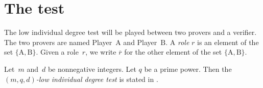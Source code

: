 \section{The test}\label{sec:the-test}

\begin{definition}[Roles]
The low individual degree test will be played between two provers and a verifier.
The two provers are named Player~$\mathrm{A}$ and Player~$\mathrm{B}$.
A \emph{role} $r$ is an element of the set $\{\mathrm{A}, \mathrm{B}\}$.
Given a role~$r$, we write $\overline{r}$ for the other element of the set $\{\mathrm{A}, \mathrm{B}\}$.
\end{definition}

\begin{definition}
Let~$m$ and~$d$ be nonnegative integers.
Let $q$ be a prime power.
Then the \emph{$(m,q,d)$-low individual degree test}
is stated in .
\end{definition}

